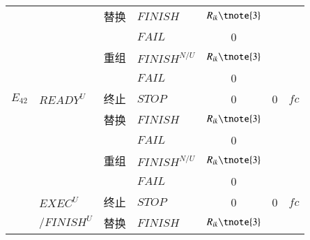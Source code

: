 \begin{table}[htbp]
\begin{threeparttable}
\begin{tabular}{clclccc}
        {}
        & {}
        & {替换} 
        & {$FINISH$} 
        & $R_{ik}\tnote{3}$ 
        & {\multirow{2}{*}{$T_{ik}$}} 
        & {\multirow{2}{*}{$C_{ik}$}} \\
        
        {}
        & {}
        & {} 
        & {$FAIL$} 
        & {0}
        & {} 
        & {} \\
        
        {}
        & {}
        & {重组} 
        & {$FINISH^{N/U}$} 
        & $R_{ik}\tnote{3}$ 
        & {\multirow{2}{*}{$T_{i0}+\sum\limits_{x = i}^j {({T_{xk}} - {T_{x0}})} $}}
        & {\multirow{2}{*}{$C_{i0}+\sum\limits_{x = i}^j {({C_{xk}} - {C_{x0}})} $}} \\
        
        
        {}
        & {}
        & {} 
        & {$FAIL$} 
        & {0}
        & {} 
        & {} \\
        {$E_{42}$} 
        & {${READY^U}$}
        & {终止}
        & {$STOP$} 
        & {0} 
        & {0} 
        & {$fc$} \\
        
        {}
        & {}
        & {替换} 
        & {$FINISH$} 
        & $R_{ik}\tnote{3}$ 
        & {\multirow{2}{*}{$T_{ik}-T_{i0}$}} 
        & {\multirow{2}{*}{$C_{ik}-C_{i0}$}} \\
        
        {}
        & {}
        & {} 
        & {$FAIL$} 
        & {0}
        & {} 
        & {} \\
        
        {}
        & {}
        & {重组} 
        & {$FINISH^{N/U}$} 
        & $R_{ik}\tnote{3}$ 
        & {\multirow{2}{*}{$\sum\limits_{x = i}^j {({T_{xk}} - {T_{x0}})} $}}
        & {\multirow{2}{*}{$\sum\limits_{x = i}^j {({C_{xk}} - {C_{x0}})} $}} \\
        
        
        {}
        & {}
        & {} 
        & {$FAIL$} 
        & {0}
        & {} 
        & {} \\
        {} 
        & {${EXEC^U}$}
        & {终止}
        & {$STOP$} 
        & {0} 
        & {0} 
        & {$fc$} \\
        
        {}
        & \multicolumn{1}{r}{$/FINISH^U$}
        & {替换} 
        & {$FINISH$} 
        & $R_{ik}\tnote{3}$ 
        & {\multirow{2}{*}{$T_{ik}$}} 
        & {\multirow{2}{*}{$C_{ik}$}} \\
        

\end{tabular}
\end{threeparttable}
\end{table}
